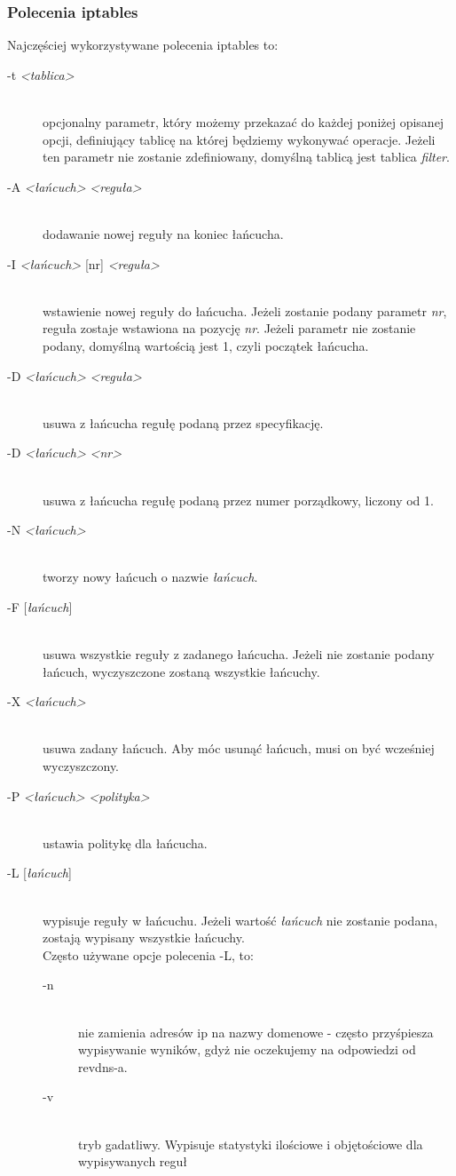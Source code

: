 \documentclass[a4paper,12pt]{book}
\newcommand{\param}[1]{\textit{\textless #1\textgreater}}
\begin{document}
		\subsubsection{Polecenia iptables}
			Najczęściej wykorzystywane polecenia iptables to:
			\begin{description}
				\item[-t \param{tablica}] \hfill \\
					opcjonalny parametr, który możemy przekazać do każdej poniżej opisanej opcji, definiujący tablicę na której będziemy wykonywać operacje.
					Jeżeli ten parametr nie zostanie zdefiniowany, domyślną tablicą jest tablica \textit{filter}.
				\item[-A \param{łańcuch} \param{reguła}] \hfil \\
					dodawanie nowej reguły na koniec łańcucha.
				\item[-I \param{łańcuch} {[nr]} \param{reguła}] \hfill \\
					wstawienie nowej reguły do łańcucha. Jeżeli zostanie podany parametr \textit{nr}, reguła zostaje wstawiona na pozycję \textit{nr}.
					Jeżeli parametr nie zostanie podany, domyślną wartością jest 1, czyli początek łańcucha.
				\item[-D \param{łańcuch} \param{reguła}] \hfill \\
					usuwa z łańcucha regułę podaną przez specyfikację.
				\item[-D \param{łańcuch} \param{nr}] \hfill \\
					usuwa z łańcucha regułę podaną przez numer porządkowy, liczony od 1.
				\item[-N \param{łańcuch}] \hfill \\
					tworzy nowy łańcuch o nazwie \textit{łańcuch}.
				\item[-F {[\textit{łańcuch}]}] \hfill \\
					usuwa wszystkie reguły z zadanego łańcucha. Jeżeli nie zostanie podany łańcuch, wyczyszczone zostaną wszystkie łańcuchy.
				\item[-X \param{łańcuch}] \hfill \\
					usuwa zadany łańcuch. Aby móc usunąć łańcuch, musi on być wcześniej wyczyszczony.	
				\item[-P \param{łańcuch} \param{polityka}] \hfill \\
					ustawia politykę dla łańcucha.
				\item[-L {[\textit{łańcuch}]}] \hfill \\
					wypisuje reguły w łańcuchu. Jeżeli wartość \textit{łańcuch} nie zostanie podana, zostają wypisany wszystkie łańcuchy.\\
					Często używane opcje polecenia -L, to:
					\begin{description}
						\item[-n] \hfill \\
							nie zamienia adresów ip na nazwy domenowe - często przyśpiesza wypisywanie wyników, gdyż nie oczekujemy na odpowiedzi od revdns-a.
						\item[-v] \hfill \\
							tryb gadatliwy. Wypisuje statystyki ilościowe i objętościowe dla wypisywanych reguł
					\end{description}
			\end{description}
\end{document}
